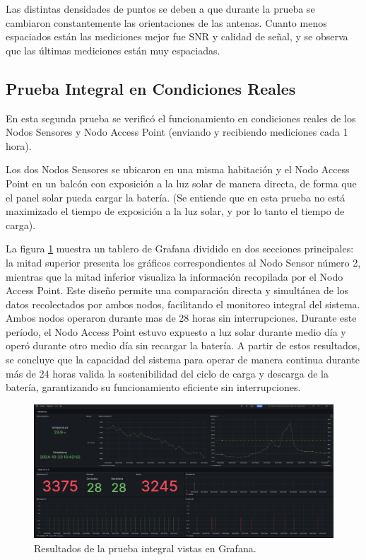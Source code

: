 Las distintas densidades de puntos se deben a que durante la prueba se cambiaron constantemente las orientaciones de las antenas. Cuanto menos espaciados están las mediciones mejor fue SNR y calidad de señal, y se observa que las últimas mediciones están muy espaciadas.

\subsection{Prueba Integral en Condiciones Reales}

En esta segunda prueba se verificó el funcionamiento en condiciones reales de los Nodos Sensores y Nodo  Access Point (enviando y recibiendo mediciones cada 1 hora).

Los dos Nodos Sensores se ubicaron en una misma habitación y el Nodo Access Point en un balcón con exposición a la luz solar de manera directa, de forma que el panel solar pueda cargar la batería. (Se entiende que en esta prueba no está maximizado el tiempo de exposición a la luz solar, y por lo tanto el tiempo de carga).

La figura \ref{fig:pruebas_grafana} muestra un tablero de Grafana dividido en dos secciones principales: la mitad superior presenta los gráficos correspondientes al Nodo Sensor número 2, mientras que la mitad inferior visualiza la información recopilada por el Nodo Access Point. Este diseño permite una comparación directa y simultánea de los datos recolectados por ambos nodos, facilitando el monitoreo integral del sistema.
Ambos nodos operaron durante mas de 28 horas sin interrupciones. 
Durante este período, el Nodo Access Point estuvo expuesto a luz solar durante medio día y operó durante otro medio día sin recargar la batería. A partir de estos resultados, se concluye que la capacidad del sistema para operar de manera continua durante más de 24 horas valida la sostenibilidad del ciclo de carga y descarga de la batería, garantizando su funcionamiento eficiente sin interrupciones.

\begin{figure}[H]
    \centering
    \includegraphics[width=1\linewidth]{Figures/Pruebas/pruebas_grafana.png}
    \caption{Resultados de la prueba integral vistas en Grafana.}
    \label{fig:pruebas_grafana}
\end{figure}


